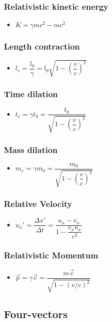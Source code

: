 \documentclass[]{report}
\newcommand \tab[1][1cm]{\hspace*{#1}}
\newcommand{\itemt}{\item \tab}
\begin{document}
\subsubsection{Relativistic kinetic energy}
\begin{itemize}
\itemt \( K = \gamma mc^2 - mc^2 \)
\end{itemize}

\subsubsection{Length contraction}
\begin{itemize}
\itemt \( l_v = \dfrac{l_0}{\gamma} = l_0\sqrt{1-(\dfrac{v}{c})^2} \)
\end{itemize}

\subsubsection{Time dilation}
\begin{itemize}
\itemt \( t_v = \gamma t_0 = \dfrac{t_0}{\sqrt{1-(\dfrac{v}{c})^2}}\)
\end{itemize}

\subsubsection{Mass dilation}
\begin{itemize}
\itemt \( m_v = \gamma m_0 = \dfrac{m_0}{\sqrt{1-(\dfrac{v}{c})^2}}\)
\end{itemize}

\subsubsection{Relative Velocity}
\begin{itemize}
\itemt \( u_x'= \dfrac{\Delta x'}{\Delta  t} = \dfrac{u_x-v_x}{1-\dfrac{v_xu_x}{c^2}} \)
\end{itemize}

\subsubsection{Relativistic Momentum}
\begin{itemize}
\itemt \( \vec{p} = \gamma \vec{v} = \dfrac{m\vec{v}}{\sqrt{1-(v/c)^2}} \)
\end{itemize}

\subsection{Four-vectors}
\def\arraystretch{1}
\end{document}
